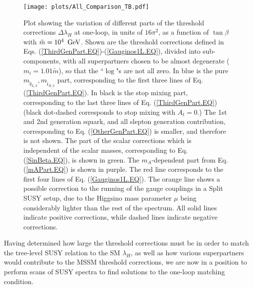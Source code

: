 \documentclass[12pt]{article}
\newcommand{\sq}{\tilde{q}}
\newcommand{\mStL}{m_{\sq_{L,3}}}
\newcommand{\mStR}{m_{\tilde{t}_{R,3}}}
\newcommand{\mS}{\tilde{m}}
\newcommand{\gev}{{\, {\rm GeV}}}
\begin{document}
\begin{figure}[t!]
\centering
\texttt{[image: plots/All\_Comparison\_TB.pdf]}
\caption{Plot showing the variation of different parts of the threshold corrections $\Delta\lambda_H$ at one-loop, in units of $16\pi^2$, as a function of $\tan \beta$ with $\mS = 10^4 \ \gev$. Shown are the threshold corrections defined in Eqs. (\ref{ThirdGenPart.EQ})-(\ref{Gauginos1L.EQ}), divided into sub-components, with all superpartners chosen to be almost degenerate ($m_i = 1.01 \mS$), so that the ``$\log$"s are not all zero. In blue is the pure $\mStL,\mStR$ part, corresponding to the first three lines of Eq. (\ref{ThirdGenPart.EQ}). In black is the stop mixing part, corresponding to the last three lines of Eq. (\ref{ThirdGenPart.EQ}) (black dot-dashed corresponds to stop mixing with $A_t = 0$.) The 1st and 2nd generation squark, and all slepton generation contribution, corresponding to Eq. (\ref{OtherGenPart.EQ}) is smaller, and therefore is not shown. The part of the scalar corrections which is independent of the scalar masses, corresponding to Eq. (\ref{SinBeta.EQ}), is shown in green. The $m_A$-dependent part from Eq. (\ref{mAPart.EQ}) is shown in purple. The red line corresponds to the first four lines of Eq. (\ref{Gauginos1L.EQ}). The orange line shows a possible correction to the running of the gauge couplings in a Split SUSY setup, due to the Higgsino mass parameter $\mu$ being considerably lighter than the rest of the spectrum. All solid lines indicate positive corrections, while dashed lines indicate negative corrections.}
\label{DeltaLambdaTB.FIG}
\end{figure}


Having determined how large the threshold corrections must be in order to match the tree-level SUSY relation to the SM $\lambda_H$, as well as how various superpartners would contribute to the MSSM threshold corrections, we are now in a position to perform scans of SUSY spectra  to find solutions to the one-loop matching condition.
\end{document}

